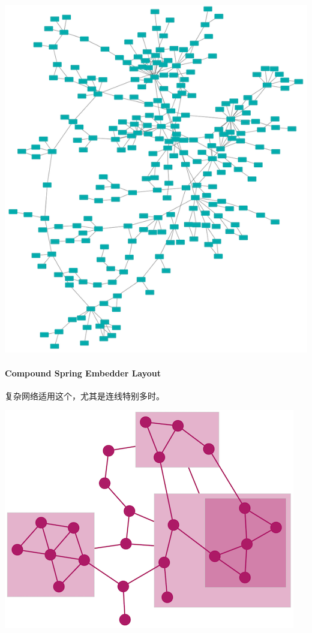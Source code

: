 \documentclass[]{article}
\numberwithin{figure}{section}
\numberwithin{table}{section}
\theoremstyle{definition}
\theoremstyle{definition}
\theoremstyle{definition}
\theoremstyle{remark}
\begin{document}
\begin{center}\includegraphics[width=0.95\linewidth,height=0.7\textheight,keepaspectratio]{images/force_layout} \end{center}

\paragraph{Compound Spring Embedder
Layout}\label{compound-spring-embedder-layout}

复杂网络适用这个，尤其是连线特别多时。

\begin{center}\includegraphics[width=0.95\linewidth,height=0.7\textheight,keepaspectratio]{images/cose_layout} \end{center}
\end{document}
